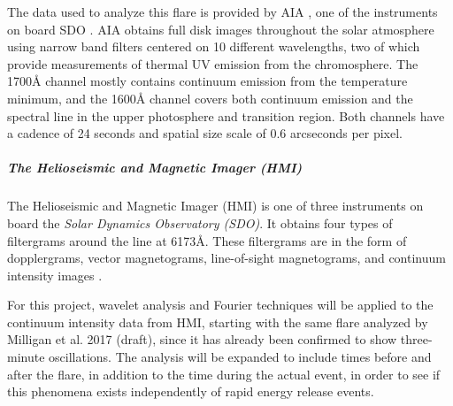 The data used to analyze this flare is provided by
AIA \citep{Lemen2012},
one of the instruments on board
SDO \citep{Pesnell2012}.
AIA obtains full disk images throughout the solar atmosphere using narrow band
filters centered on 10 different wavelengths, two of which provide measurements
of thermal UV emission from the chromosphere.
The 1700\AA{} channel mostly contains
continuum emission from the temperature minimum, and the
1600\AA{} channel covers both continuum emission and the
 spectral line in the upper photosphere and transition region.
Both channels have a cadence of 24 seconds and
spatial size scale of 0.6 arcseconds per pixel.

\subparagraph{The Helioseismic and Magnetic Imager (HMI)}

The Helioseismic and Magnetic Imager (HMI)
is one of three instruments on board
the \textit{Solar Dynamics Observatory (SDO)}. It obtains four types of
filtergrams around the  line at 6173\AA{}. These filtergrams are
in the form of dopplergrams, vector magnetograms, line-of-sight magnetograms,
and continuum intensity images \citep{hmi}.

For this project, wavelet analysis and
Fourier techniques will be applied to the
continuum intensity data from HMI, starting with the same flare analyzed by
Milligan et al. 2017 (draft),
since it has already been confirmed to show three-minute oscillations. The
analysis will be expanded to include times before and after the flare, in addition
to the time during the actual event, in order to see if this phenomena exists
independently of rapid energy release events.



